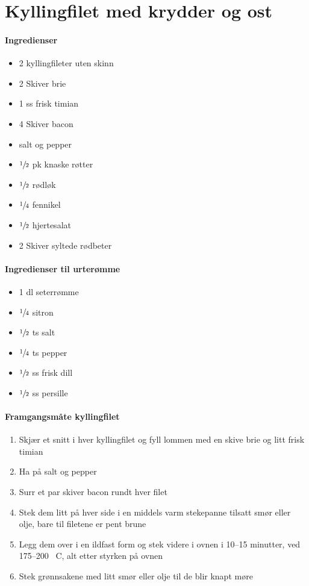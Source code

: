 \section{﻿Kyllingfilet med krydder og ost}


\paragraph{Ingredienser}
\begin{itemize}[noitemsep]
	\item 2 kyllingfileter uten skinn
	\item 2 Skiver  brie
	\item 1 ss frisk timian
	\item 4 Skiver bacon
	\item salt og pepper
	\item $\sfrac{1}{2}$  pk knaske røtter
	\item $\sfrac{1}{2}$  rødløk
	\item $\sfrac{1}{4}$  fennikel
	\item $\sfrac{1}{2}$  hjertesalat
	\item 2 Skiver syltede rødbeter
\end{itemize}

\paragraph{Ingredienser til urterømme}
\begin{itemize}[noitemsep]
	\item 1 dl seterrømme
	\item $\sfrac{1}{4}$  sitron
	\item $\sfrac{1}{2}$  ts salt
	\item $\sfrac{1}{4}$  ts pepper
	\item $\sfrac{1}{2}$  ss frisk dill
	\item $\sfrac{1}{2}$  ss persille
\end{itemize}

\paragraph{Framgangsmåte kyllingfilet}
\begin{enumerate}[noitemsep]
	\item Skjær et snitt i hver kyllingfilet og fyll lommen med en skive brie og litt frisk timian
	\item Ha på salt og pepper
	\item Surr et par skiver bacon rundt hver filet
	\item Stek dem litt på hver side i en middels varm stekepanne tilsatt smør eller olje, bare til filetene er pent brune
	\item Legg dem over i en ildfast form og stek videre i ovnen i 10--15 minutter, ved 175--200 \degree~C, alt etter styrken på ovnen
	\item Stek grønnsakene med litt smør eller olje til de blir knapt møre
\end{enumerate}


